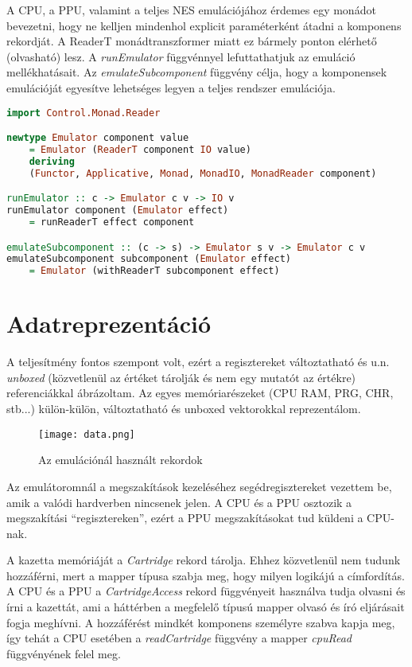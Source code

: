 A CPU, a PPU, valamint a teljes NES emulációjához érdemes egy monádot bevezetni, hogy ne kelljen mindenhol explicit paraméterként átadni a komponens rekordját. A ReaderT monádtranszformer miatt ez bármely ponton elérhető (olvasható) lesz. A \emph{runEmulator} függvénnyel lefuttathatjuk az emuláció mellékhatásait. Az \emph{emulateSubcomponent} függvény célja, hogy a komponensek emulációját egyesítve lehetséges legyen a teljes rendszer emulációja.
\vspace{0.2cm}
\begin{lstlisting}[language=Haskell, basicstyle=\scriptsize]
import Control.Monad.Reader

newtype Emulator component value 
	= Emulator (ReaderT component IO value) 
	deriving 
	(Functor, Applicative, Monad, MonadIO, MonadReader component)

runEmulator :: c -> Emulator c v -> IO v
runEmulator component (Emulator effect) 
	= runReaderT effect component

emulateSubcomponent :: (c -> s) -> Emulator s v -> Emulator c v
emulateSubcomponent subcomponent (Emulator effect) 
	= Emulator (withReaderT subcomponent effect)
\end{lstlisting}

\section{Adatreprezentáció}

A teljesítmény fontos szempont volt, ezért a regisztereket változtatható és u.n. \emph{unboxed} (közvetlenül az értéket tárolják és nem egy mutatót az értékre) referenciákkal ábrázoltam. Az egyes memóriarészeket (CPU RAM, PRG, CHR, stb...) külön-külön, változtatható és unboxed vektorokkal reprezentálom.

\begin{figure}[H]
	\centering
	\texttt{[image: data.png]}
	\caption{Az emulációnál használt rekordok}
\end{figure}

Az emulátoromnál a megszakítások kezeléséhez segédregisztereket vezettem be, amik a valódi hardverben nincsenek jelen. A CPU és a PPU osztozik a megszakítási ``regisztereken'', ezért a PPU megszakításokat tud küldeni a CPU-nak.

A kazetta memóriáját a \emph{Cartridge} rekord tárolja. Ehhez közvetlenül nem tudunk hozzáférni, mert a mapper típusa szabja meg, hogy milyen logikájú a címfordítás. A CPU és a PPU a \emph{CartridgeAccess} rekord függvényeit használva tudja olvasni és írni a kazettát, ami a háttérben a megfelelő típusú mapper olvasó és író eljárásait fogja meghívni. A hozzáférést mindkét komponens személyre szabva kapja meg, így tehát a CPU esetében a \emph{readCartridge} függvény a mapper \emph{cpuRead} függvényének felel meg.

